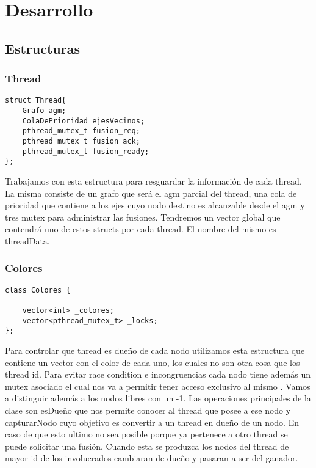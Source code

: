 \section{Desarrollo}

\subsection{Estructuras}

\subsubsection{Thread}
\begin{verbatim}
struct Thread{
    Grafo agm;
    ColaDePrioridad ejesVecinos;
    pthread_mutex_t fusion_req;   
    pthread_mutex_t fusion_ack;   
    pthread_mutex_t fusion_ready; 
};
\end{verbatim}

  Trabajamos con esta estructura para resguardar la información de cada thread. La misma consiste de un grafo que será el agm parcial del thread, una cola de prioridad que contiene a los ejes cuyo nodo destino es alcanzable desde el agm y tres mutex para administrar las fusiones. Tendremos un vector global que contendrá uno de estos structs por cada thread. El nombre del mismo es threadData.
  
\subsubsection{Colores}
\begin{verbatim}
class Colores {

    vector<int> _colores;
    vector<pthread_mutex_t> _locks;
};
\end{verbatim}
Para controlar que thread es dueño de cada nodo utilizamos esta estructura que contiene un vector con el color de cada uno, los cuales no son otra cosa que los thread id. Para evitar race condition e incongruencias cada nodo tiene además un mutex asociado el cual nos va a permitir tener acceso exclusivo al mismo . Vamos a distinguir además a los nodos libres con un -1.  Las operaciones principales de la clase son esDueño que nos permite conocer al thread que posee a ese nodo y capturarNodo cuyo objetivo es convertir a un thread en dueño de un nodo. En caso de que esto ultimo no sea posible porque ya pertenece a otro thread se puede solicitar una fusión. Cuando esta se produzca los nodos del thread de mayor id de los involucrados cambiaran de dueño y pasaran a ser del ganador. 

